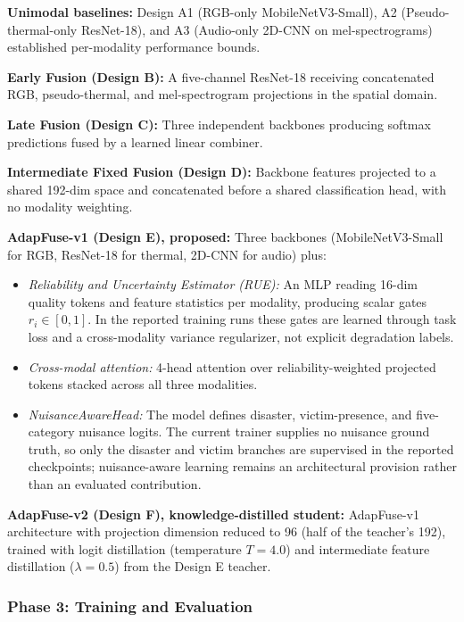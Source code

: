 \documentclass[journal]{IEEEtran}
\begin{document}
\textbf{Unimodal baselines:} Design A1 (RGB-only MobileNetV3-Small), A2 (Pseudo-thermal-only ResNet-18), and A3 (Audio-only 2D-CNN on mel-spectrograms) established per-modality performance bounds.

\textbf{Early Fusion (Design B):} A five-channel ResNet-18 receiving concatenated RGB, pseudo-thermal, and mel-spectrogram projections in the spatial domain.

\textbf{Late Fusion (Design C):} Three independent backbones producing softmax predictions fused by a learned linear combiner.

\textbf{Intermediate Fixed Fusion (Design D):} Backbone features projected to a shared 192-dim space and concatenated before a shared classification head, with no modality weighting.

\textbf{AdapFuse-v1 (Design E), proposed:} Three backbones (MobileNetV3-Small for RGB, ResNet-18 for thermal, 2D-CNN for audio) plus:
\begin{itemize}
    \item \textit{Reliability and Uncertainty Estimator (RUE):} An MLP reading 16-dim quality tokens and feature statistics per modality, producing scalar gates $r_i \in [0,1]$. In the reported training runs these gates are learned through task loss and a cross-modality variance regularizer, not explicit degradation labels.
    \item \textit{Cross-modal attention:} 4-head attention over reliability-weighted projected tokens stacked across all three modalities.
    \item \textit{NuisanceAwareHead:} The model defines disaster, victim-presence, and five-category nuisance logits. The current trainer supplies no nuisance ground truth, so only the disaster and victim branches are supervised in the reported checkpoints; nuisance-aware learning remains an architectural provision rather than an evaluated contribution.
\end{itemize}

\textbf{AdapFuse-v2 (Design F), knowledge-distilled student:} AdapFuse-v1 architecture with projection dimension reduced to 96 (half of the teacher's 192), trained with logit distillation (temperature $T=4.0$) and intermediate feature distillation ($\lambda=0.5$) from the Design E teacher.

\subsubsection{Phase 3: Training and Evaluation}
\end{document}
